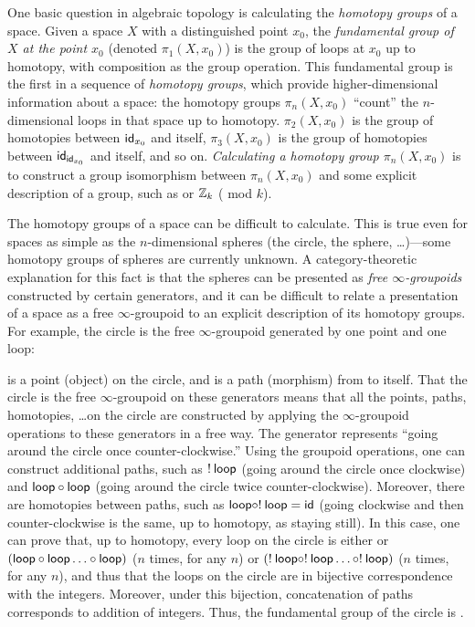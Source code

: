 One basic question in algebraic topology is calculating the
\emph{homotopy groups} of a space.  Given a space $X$ with a
distinguished point $x_0$, the \emph{fundamental group of $X$ at the point $x_0$} (denoted
$\pi_1(X,x_0)$) is the group of loops at $x_0$ up to homotopy, with composition as the group operation.
This fundamental group is the first in a sequence of \emph{homotopy
  groups}, which provide higher-dimensional information about a space:
the homotopy groups $\pi_n(X,x_0)$ ``count'' the $n$-dimensional loops in 
that space up to homotopy.  $\pi_2(X,x_0)$ is the group of homotopies between
$\mathsf{id}_{{x_0}}$ and itself, $\pi_3(X,x_0)$ is the group of homotopies
between $\mathsf{id}_{\mathsf{id}_{{x_0}}}$ and itself, and so on.
\emph{Calculating a homotopy group $\pi_n(X,x_0)$} is to construct a group isomorphism
between $\pi_n(X,x_0)$ and some explicit description of a group,
such as \Z\/ or $\mathbb{Z}_k$ (\Z\/ mod $k$).  

The homotopy groups of a space can be difficult to calculate.  This is
true even for spaces as simple as the $n$-dimensional spheres (the
circle, the sphere, \ldots)---some homotopy groups of spheres are
currently unknown.  A category-theoretic explanation for this fact is
that the spheres can be presented as \emph{free
  $\infty$-groupoids} constructed by certain generators, and it can be
difficult to relate a presentation of a space as a free
$\infty$-groupoid to an explicit description of its homotopy groups.
For example, the circle is the free $\infty$-groupoid generated by one point
and one loop:
%
\begin{center}
\end{center}
%
%
 is a point (object) on the circle, and  is a path
(morphism) from  to itself.  That the circle is the free
$\infty$-groupoid on these generators means that all the points, paths,
homotopies, \ldots on the circle are constructed by applying the
$\infty$-groupoid operations to these generators in a free way.  The generator
 represents ``going around the circle once
counter-clockwise.''  Using the groupoid operations, one can construct
additional paths, such as $! \: \mathsf{loop}$ (going around the circle once
clockwise) and $\mathsf{loop} \mathbin{\circ} \mathsf{loop}$ (going around the circle
twice counter-clockwise).  Moreover, there are homotopies between paths,
such as $\mathsf{loop} \mathbin{\circ} ! \: \mathsf{loop} = \mathsf{id}$ (going clockwise and
then counter-clockwise is the same, up to homotopy, as staying still).
In this case, one can prove that, up to homotopy,
every loop on the circle is either  or $(\mathsf{loop} \mathbin{\circ}
\mathsf{loop} \ldots \mathbin{\circ} \mathsf{loop})$ ($n$ times, for any $n$) or $(! \: 
\mathsf{loop} \mathbin{\circ} ! \:   \mathsf{loop} \ldots \mathbin{\circ} ! \:  \mathsf{loop})$ ($n$ times,
for any $n$), and thus that the loops on the circle are in bijective
correspondence with the integers.  Moreover, under this bijection, concatenation of paths corresponds to
addition of integers.  Thus, the fundamental group of the
circle is \Z.

